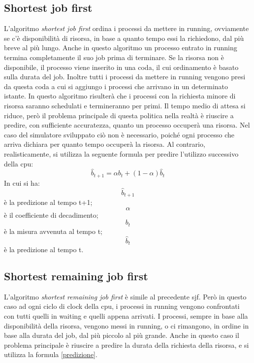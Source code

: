 \documentclass[Lau, oneside]{sapthesis}%
\begin{document}
\subsection{Shortest job first}
\label{ssec:sjf}
L'algoritmo \textit{shortest job first} ordina i processi da mettere in running, ovviamente se c'è disponibilità di risorsa, in base a quanto tempo essi la richiedono, dal più breve al più lungo.
Anche in questo algoritmo un processo entrato in running termina completamente il suo job prima di terminare.
Se la risorsa non è disponibile, il processo viene inserito in una coda, il cui ordinamento è basato sulla durata del job.
Inoltre tutti i processi da mettere in running vengono presi da questa coda a cui si aggiungo i processi che arrivano in un determinato istante.
In questo algoritmo risulterà che i processi con la richiesta minore di risorsa saranno schedulati e termineranno per primi.
Il tempo medio di attesa si riduce, però il problema principale di questa politica nella realtà è riuscire a predire, con sufficiente accuratezza, quanto un processo occuperà una risorsa.
Nel caso del simulatore sviluppato ciò non è necessario, poiché ogni processo che arriva dichiara per quanto tempo occuperà la risorsa.
Al contrario, realisticamente, si utilizza la seguente formula per predire l'utilizzo successivo della cpu:
\begin{equation}\label{predizione}
   \hat{b}_{t+1} = \alpha b_t + (1 - \alpha) \hat{b}_t
\end{equation}
In cui si ha:
\begin{equation}
  \hat{b}_{t+1}
\end{equation}
è la predizione al tempo t+1;
\begin{equation}
    \alpha
\end{equation}
è il coefficiente di decadimento;
\begin{equation}
    b_t
\end{equation}
è la misura avvenuta al tempo t;
\begin{equation}
    \hat{b}_t
\end{equation}
è la predizione al tempo t.

\subsection{Shortest remaining job first}
\label{ssec:srjf}
L'algoritmo \textit{shortest remaining job first} è simile al precedente sjf.
Però in questo caso ad ogni ciclo di clock della cpu, i processi in running vengono confrontati con tutti quelli in waiting e quelli appena arrivati.
I processi, sempre in base alla disponibilità della risorsa, vengono messi in running, o ci rimangono, in ordine in base alla durata del job, dal più piccolo al più grande.
Anche in questo caso il problema principale è riuscire a predire la durata della richiesta della risorsa, e si utilizza la formula \eqref{predizione}.
\end{document}
